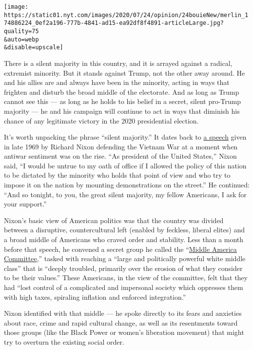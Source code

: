 \texttt{[image: https://static01.nyt.com/images/2020/07/24/opinion/24bouieNew/merlin\_174886224\_0ef2a196-777b-4841-ad15-ea92df8f4891-articleLarge.jpg?quality=75\\\&auto=webp\\\&disable=upscale]}

There is a silent majority in this country, and it is arrayed against a
radical, extremist minority. But it stands against Trump, not the other
away around. He and his allies are and always have been in the minority,
acting in ways that frighten and disturb the broad middle of the
electorate. And as long as Trump cannot see this --- as long as he holds
to his belief in a secret, silent pro-Trump majority --- he and his
campaign will continue to act in ways that diminish his chance of any
legitimate victory in the 2020 presidential election.

It's worth unpacking the phrase ``silent majority.'' It dates back to
\href{http://chnm.gmu.edu/hardhats/silent.html}{a speech} given in late
1969 by Richard Nixon defending the Vietnam War at a moment when antiwar
sentiment was on the rise. ``As president of the United States,'' Nixon
said, ``I would be untrue to my oath of office if I allowed the policy
of this nation to be dictated by the minority who holds that point of
view and who try to impose it on the nation by mounting demonstrations
on the street.'' He continued: ``And so tonight, to you, the great
silent majority, my fellow Americans, I ask for your support.''

Nixon's basic view of American politics was that the country was divided
between a disruptive, countercultural left (enabled by feckless, liberal
elites) and a broad middle of Americans who craved order and stability.
Less than a month before that speech, he convened a secret group he
called the
``\href{https://www.google.com/books/edition/President_Nixon/ajLBlZwwB0IC?hl=en\&gbpv=1\&bsq=\%E2\%80\%9Cmiddle\%20america\%20committee\%E2\%80\%9D}{Middle
America Committee},'' tasked with reaching a ``large and politically
powerful white middle class'' that is ``deeply troubled, primarily over
the erosion of what they consider to be their values.'' These Americans,
in the view of the committee, felt that they had ``lost control of a
complicated and impersonal society which oppresses them with high taxes,
spiraling inflation and enforced integration.''

Nixon identified with that middle --- he spoke directly to its fears and
anxieties about race, crime and rapid cultural change, as well as its
resentments toward those groups (like the Black Power or women's
liberation movement) that might try to overturn the existing social
order.


